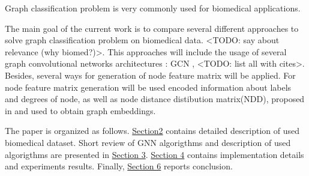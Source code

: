 Graph classification problem is very commonly used for biomedical applications.



The main goal of the current work is to compare several different approaches to solve graph classification problem 
on biomedical data. <TODO: say about relevance (why biomed?)>. This approaches will include the usage of 
several graph convolutional networks architectures : GCN \cite{GCN}, <TODO: list all with cites>. Besides, 
several ways for generation of node feature matrix will be applied. For node feature matrix generation will be used
encoded information about labels and degrees of node, as well as node distance distibution matrix(NDD), proposed in \cite{Netpro2vec}
and used to obtain graph embeddings.

The paper is organized as follows. \hyperref[sec:datasets]{Section2} contains detailed description of used biomedical dataset.
Short review of GNN algorigthms and description of used algorigthms are presented in \hyperref[sec:models]{Section 3}.
\hyperref[sec:experiments]{Section 4} contains implementation details and experiments results. Finally, \hyperref[sec:conclusion]{Section 6} reports conclusion. 
